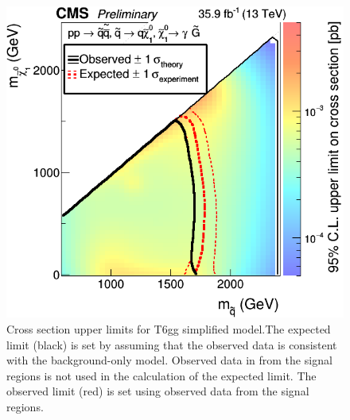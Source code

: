 \begin{figure}[h]
	\centering
	\includegraphics[width=0.9\linewidth]{Figures/T6limit_sept30}
	\caption[Cross section upper limits for T6gg simplified model.]{Cross section upper limits for T6gg simplified model.The expected limit (black) is set by assuming that the observed data is consistent with the background-only model.  Observed data in from the signal regions is not used in the calculation of the expected limit.  The observed limit (red) is set using observed data from the signal regions.}
	\label{fig:t6wgjul20xsec}
\end{figure}




